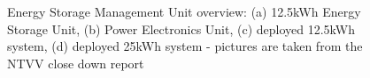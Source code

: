 \begin{figure}\centering
	\\
	\\
	\caption{Energy Storage Management Unit overview: (a) 12.5kWh Energy Storage Unit, (b) Power Electronics Unit, (c) deployed 12.5kWh system, (d) deployed 25kWh system - pictures are taken from the NTVV close down report \cite{NTVV9.8a}}
	\label{ch-literature:fig:esmu-esu}
\end{figure}